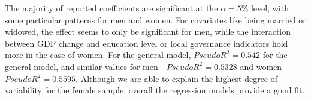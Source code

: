 The majority of reported coefficients are significant at the $\alpha = 5\% $ level, with some particular patterns for men and women. For covariates like being married or widowed, the effect seems to only be significant for men, while the interaction between GDP change and education level or local governance indicators hold more in the case of women. For the general model, $PseudoR^2 = 0.542$ for the general model, and similar values for men - $PseudoR^2 = 0.5328$ and women - $PseudoR^2 = 0.5595$. Although we are able to explain the highest degree of variability for the female sample, overall the regression models provide a good fit.























